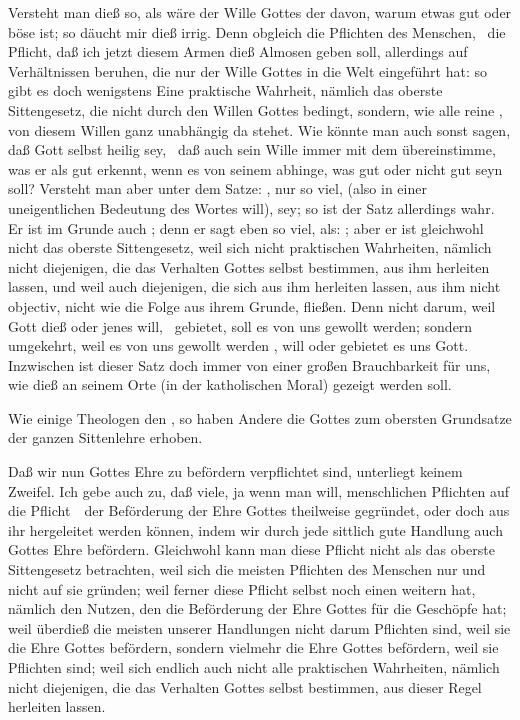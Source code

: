 Versteht man dieß so, als wäre der Wille Gottes der  davon, warum etwas gut oder böse ist; so däucht mir dieß irrig. Denn obgleich die  Pflichten des Menschen, \zB\ die Pflicht, daß ich jetzt diesem Armen dieß Almosen geben soll, allerdings auf Verhältnissen beruhen, die nur der Wille Gottes in die Welt eingeführt hat: so gibt es doch wenigstens Eine praktische Wahrheit, nämlich das oberste Sittengesetz, die nicht durch den Willen Gottes bedingt, sondern, wie alle reine , von diesem Willen ganz unabhängig da stehet. Wie könnte man auch sonst sagen, daß Gott selbst heilig sey, \dh\ daß auch sein Wille immer mit dem übereinstimme, was er als gut erkennt, wenn es von seinem  abhinge, was gut oder nicht gut seyn soll? Versteht man aber unter dem Satze: , nur so viel,  (also in einer uneigentlichen Bedeutung des Wortes will),  sey; so ist der Satz allerdings wahr. Er ist im Grunde auch ; denn er sagt eben so viel, als: ; aber er ist gleichwohl nicht das oberste Sittengesetz, weil sich nicht  praktischen Wahrheiten, nämlich nicht diejenigen, die das Verhalten Gottes selbst bestimmen, aus ihm herleiten lassen, und weil auch diejenigen, die sich aus ihm herleiten lassen, aus ihm nicht objectiv, nicht wie die Folge aus ihrem Grunde, fließen. Denn nicht darum, weil Gott dieß oder jenes will, \dh\ gebietet, soll es von uns gewollt werden; sondern umgekehrt, weil es von uns gewollt werden , will oder gebietet es uns Gott. Inzwischen ist dieser Satz doch immer von einer großen Brauchbarkeit für uns, wie dieß an seinem Orte (in der katholischen Moral) gezeigt werden soll.
\begin{aufza}\setcounter{enumi}{11}
\item Wie einige Theologen den , so haben Andere die  Gottes zum obersten Grundsatze der ganzen Sittenlehre erhoben.
\end{aufza}\par
Daß wir nun Gottes Ehre zu befördern verpflichtet sind, unterliegt keinem Zweifel. Ich gebe auch zu, daß viele, ja wenn man will,  menschlichen Pflichten auf die Pflicht~\ der Beförderung der Ehre Gottes theilweise gegründet, oder doch aus ihr hergeleitet werden können, indem wir durch jede sittlich gute Handlung auch Gottes Ehre befördern. Gleichwohl kann man diese Pflicht nicht als das oberste Sittengesetz betrachten, weil sich die meisten Pflichten des Menschen nur  und nicht  auf sie gründen; weil ferner diese Pflicht selbst noch einen weitern  hat, nämlich den Nutzen, den die Beförderung der Ehre Gottes für die Geschöpfe hat; weil überdieß die meisten unserer Handlungen nicht darum Pflichten sind, weil sie die Ehre Gottes befördern, sondern vielmehr die Ehre Gottes befördern, weil sie Pflichten sind; weil sich endlich auch nicht alle praktischen Wahrheiten, nämlich nicht diejenigen, die das Verhalten Gottes selbst bestimmen, aus dieser Regel herleiten lassen.
